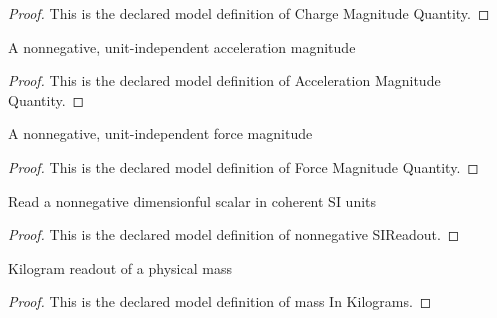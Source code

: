 \begin{proof}
  This is the declared model definition of Charge Magnitude Quantity.
\end{proof}
\begin{definition}
  \label{def:physics:phyx-mini-0902:phyxminiproblems-problemphyxmini0902-accelerationmagnitudequantity}
  A nonnegative, unit-independent acceleration magnitude
\end{definition}
\begin{proof}
  This is the declared model definition of Acceleration Magnitude Quantity.
\end{proof}
\begin{definition}
  \label{def:physics:phyx-mini-0902:phyxminiproblems-problemphyxmini0902-forcemagnitudequantity}
  A nonnegative, unit-independent force magnitude
\end{definition}
\begin{proof}
  This is the declared model definition of Force Magnitude Quantity.
\end{proof}
\begin{definition}
  \label{def:physics:phyx-mini-0902:phyxminiproblems-problemphyxmini0902-nonnegativesireadout}
  Read a nonnegative dimensionful scalar in coherent SI units
\end{definition}
\begin{proof}
  This is the declared model definition of nonnegative SIReadout.
\end{proof}
\begin{definition}
  \label{def:physics:phyx-mini-0902:phyxminiproblems-problemphyxmini0902-massinkilograms}
  Kilogram readout of a physical mass
\end{definition}
\begin{proof}
  This is the declared model definition of mass In Kilograms.
\end{proof}

